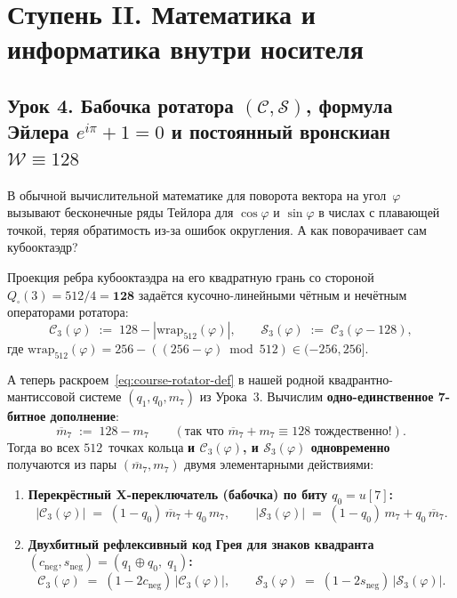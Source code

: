 \chapter{Ступень II. Математика и информатика внутри носителя}
\label{ch:course-stage2-math}

\section{Урок 4. Бабочка ротатора \texorpdfstring{$(\mathcal{C},\mathcal{S})$}{(C,S)}, формула Эйлера \texorpdfstring{$e^{i\pi}+1=0$}{e\^{}\{i pi\}+1=0} и постоянный вронскиан \texorpdfstring{$\mathcal{W}\equiv 128$}{W = 128}}

В обычной вычислительной математике для поворота вектора на угол~$\varphi$ вызывают бесконечные ряды Тейлора для $\cos\varphi$ и $\sin\varphi$ в числах с плавающей точкой, теряя обратимость из-за ошибок округления. А как поворачивает сам кубооктаэдр?

Проекция ребра кубооктаэдра на его квадратную грань со стороной $Q_\square(3) = 512 / 4 = \mathbf{128}$ задаётся кусочно-линейными чётным и нечётным операторами ротатора:
\begin{equation}
  \label{eq:course-rotator-def}
  \mathcal{C}_3(\varphi) \;:=\; 128 - |\mathrm{wrap}_{512}(\varphi)|,
  \qquad
  \mathcal{S}_3(\varphi) \;:=\; \mathcal{C}_3(\varphi - 128),
\end{equation}
где $\mathrm{wrap}_{512}(\varphi) = 256 - ((256 - \varphi)\bmod 512)\in(-256,256]$.

А теперь раскроем~\eqref{eq:course-rotator-def} в нашей родной квадрантно-мантиссовой системе $(q_1,q_0,m_7)$ из Урока~3. Вычислим \textbf{одно-единственное 7-битное дополнение}:
\[
  \overline{m}_7 \;:=\; 128 - m_7 \qquad (\text{так что } \overline{m}_7 + m_7 \equiv 128 \text{ тождественно!}).
\]
Тогда во всех $512$~точках кольца \textbf{и $\mathcal{C}_3(\varphi)$, и $\mathcal{S}_3(\varphi)$ одновременно} получаются из пары $(\overline{m}_7, m_7)$ двумя элементарными действиями:
\begin{enumerate}[label=\textbf{\arabic*.},noitemsep]
\item \textbf{Перекрёстный X-переключатель (бабочка) по биту $q_0 = u[7]$:}
  \[
    |\mathcal{C}_3(\varphi)| \;=\; (1 - q_0)\,\overline{m}_7 + q_0\,m_7,
    \qquad
    |\mathcal{S}_3(\varphi)| \;=\; (1 - q_0)\,m_7 + q_0\,\overline{m}_7.
  \]
\item \textbf{Двухбитный рефлексивный код Грея для знаков квадранта $(c_{\mathrm{neg}}, s_{\mathrm{neg}}) = (q_1\oplus q_0,\; q_1)$:}
  \[
    \mathcal{C}_3(\varphi) \;=\; (1 - 2c_{\mathrm{neg}})\,|\mathcal{C}_3(\varphi)|,
    \qquad
    \mathcal{S}_3(\varphi) \;=\; (1 - 2s_{\mathrm{neg}})\,|\mathcal{S}_3(\varphi)|.
  \]
\end{enumerate}

